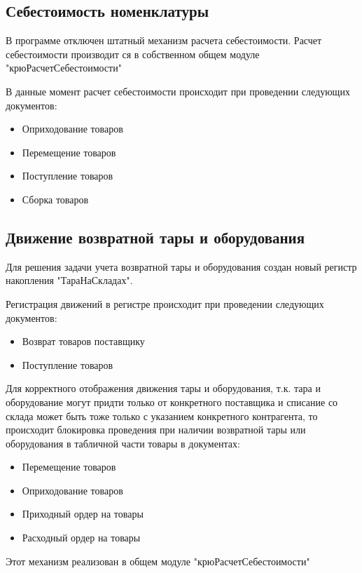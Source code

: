  
\subsection{Себестоимость номенклатуры}\label{1002}	 

В программе отключен штатный механизм расчета себестоимости. Расчет себестоимости производит ся в собственном общем модуле "крюРасчетСебестоимости"

В данные момент расчет себестоимости происходит при проведении следующих документов:  
\begin{itemize}
	\item Оприходование товаров
	\item Перемещение товаров
	\item Поступление товаров
	\item Сборка товаров
	
\end{itemize}

\subsection{Движение возвратной тары и оборудования}\label{1003}	 

Для решения задачи учета возвратной тары и оборудования создан новый регистр накопления "ТараНаСкладах". 

Регистрация движений в регистре происходит при проведении следующих документов:  
\begin{itemize}
	\item Возврат товаров поставщику
	\item Поступление товаров
\end{itemize}

Для корректного отображения движения тары и оборудования, т.к. тара и оборудование могут придти только от конкретного поставщика и списание со склада может быть тоже только с указанием конкретного контрагента, то происходит блокировка проведения при наличии возвратной тары или оборудования в табличной части товары в  документах:

\begin{itemize}
	\item Перемещение товаров
	\item Оприходование товаров
	\item Приходный ордер на товары
	\item Расходный ордер на товары
\end{itemize}

Этот механизм реализован в общем модуле "крюРасчетСебестоимости"
	 

